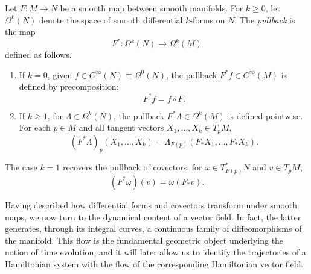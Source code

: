 \begin{definition}[Pullback]\label{def:pullback}
	Let $F: M \to N$ be a smooth map between smooth manifolds. For $k \geq 0$, let $\Omega^k(N)$ denote the space of smooth differential $k$-forms on $N$. The \textit{pullback} is the map
	\[
	F^*: \Omega^k(N) \to \Omega^k(M)
	\]
	defined as follows.
	\begin{enumerate}
		\item If $k = 0$, given $f \in C^\infty(N) \equiv \Omega^0(N)$, the pullback $F^*f \in C^\infty(M)$ is defined by precomposition:
		\[
		F^*f = f \circ F.
		\]
		
		\item If $k \geq 1$, for $\Lambda \in \Omega^k(N)$, the pullback $F^*\Lambda \in \Omega^k(M)$ is defined pointwise. For each $p \in M$ and all tangent vectors $X_1, \dots, X_k \in T_pM$,
		\[
		(F^*\Lambda)_p(X_1, \dots, X_k) = \Lambda_{F(p)}(F_*X_1, \dots, F_*X_k).
		\]
	\end{enumerate}
\end{definition}

\begin{remark}
	The case $k = 1$ recovers the pullback of covectors: for $\omega \in T_{F(p)}^*N$ and $v \in T_pM$,
	\[
	(F^*\omega)(v) = \omega(F_*v).
	\]
\end{remark}

Having described how differential forms and covectors transform under smooth maps, we now turn to the dynamical content of a vector field. In fact, the latter generates, through its integral curves, a continuous family of diffeomorphisms of the manifold. This flow is the fundamental geometric object underlying the notion of time evolution, and it will later allow us to identify the trajectories of a Hamiltonian system with the flow of the corresponding Hamiltonian vector field.

